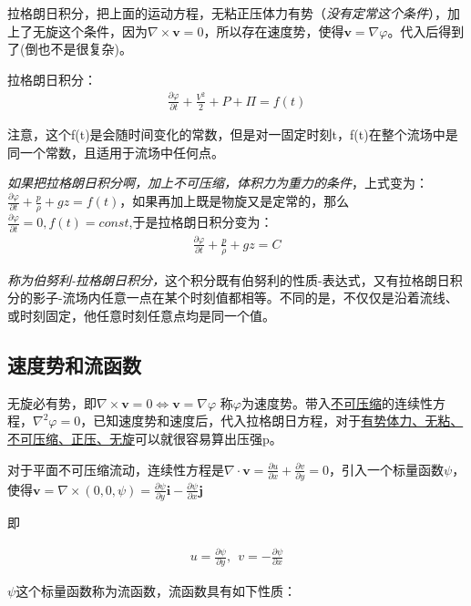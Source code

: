 \documentclass[UTF8,12pt]{article}
\begin{document}
拉格朗日积分，把上面的运动方程，无粘正压体力有势（\emph{没有定常这个条件}），加上了无旋这个条件，因为$\nabla \times \boldsymbol v = 0$，所以存在速度势，使得$\boldsymbol v = \nabla \varphi$。代入后得到了(倒也不是很复杂)。

拉格朗日积分：
\begin{align*}
    \frac{\partial \varphi}{\partial t} + \frac{V^2}{2} + P + \Pi  = f(t)
\end{align*}

注意，这个f(t)是会随时间变化的常数，但是对一固定时刻t，f(t)在整个流场中是同一个常数，且适用于流场中任何点。

\emph{如果把拉格朗日积分啊，加上不可压缩，体积力为重力的条件}，上式变为：$\frac{\partial \varphi}{\partial t} + \frac{p}{\rho} + gz = f(t)$，如果再加上既是物旋又是定常的，那么$\frac{\partial \varphi}{\partial t} = 0, f(t) = const$,于是拉格朗日积分变为：
\begin{align*}
    \frac{\partial \varphi}{\partial t} + \frac{p}{\rho} + gz = C
\end{align*}

\emph{称为伯努利-拉格朗日积分，}这个积分既有伯努利的性质-表达式，又有拉格朗日积分的影子-流场内任意一点在某个时刻值都相等。不同的是，不仅仅是沿着流线、或时刻固定，他任意时刻任意点均是同一个值。

\subsection{速度势和流函数}

无旋必有势，即$\nabla \times \boldsymbol v = 0 \Longleftrightarrow \boldsymbol v = \nabla \varphi$ 称$\varphi$为速度势。带入\uline{不可压缩}的连续性方程，$\nabla ^2 \varphi = 0$，已知速度势和速度后，代入拉格朗日方程，对于\uline{有势体力、无粘、不可压缩、正压、无旋}可以就很容易算出压强p。

对于平面不可压缩流动，连续性方程是$\nabla \cdot \boldsymbol v = \frac{\partial u}{\partial x}+\frac{\partial v}{\partial y} = 0$，引入一个标量函数$\psi$，
使得$\boldsymbol v = \nabla \times  (0,0,\psi) = \frac{\partial \psi}{\partial y} \boldsymbol i - \frac{\partial \psi}{\partial x} \boldsymbol j$

即

\begin{align*}
    u = \frac{\partial \psi}{\partial y}, ~~ v = -\frac{\partial \psi}{\partial x}
\end{align*}

$\psi$这个标量函数称为流函数，流函数具有如下性质：
\end{document}
